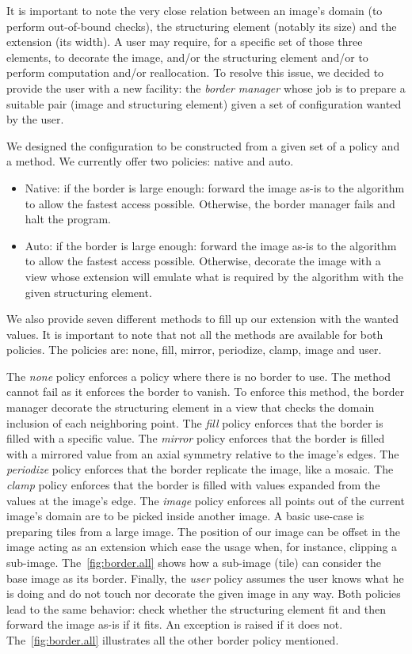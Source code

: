 It is important to note the very close relation between an image's domain (to perform out-of-bound checks), the
structuring element (notably its size) and the extension (its width). A user may require, for a specific set of those
three elements, to decorate the image, and/or the structuring element and/or to perform computation and/or reallocation.
To resolve this issue, we decided to provide the user with a new facility: the \emph{border manager} whose job is to
prepare a suitable pair (image and structuring element) given a set of configuration wanted by the user.

We designed the configuration to be constructed from a given set of a policy and a method. We currently offer two
policies: native and auto.

\begin{itemize}
  \item Native: if the border is large enough: forward the image as-is to the algorithm to allow the fastest access
        possible. Otherwise, the border manager fails and halt the program.
  \item Auto: if the border is large enough: forward the image as-is to the algorithm to allow the fastest access
        possible. Otherwise, decorate the image with a view whose extension will emulate what is required by the
        algorithm with the given structuring element.
\end{itemize}

We also provide seven different methods to fill up our extension with the wanted values. It is important to note that
not all the methods are available for both policies. The policies are: none, fill, mirror, periodize, clamp, image and
user.

The \emph{none} policy enforces a policy where there is no border to use. The method cannot fail as it enforces the
border to vanish. To enforce this method, the border manager decorate the structuring element in a view that checks the
domain inclusion of each neighboring point. The \emph{fill} policy enforces that the border is filled with a specific
value. The \emph{mirror} policy enforces that the border is filled with a mirrored value from an axial symmetry relative
to the image's edges. The \emph{periodize} policy enforces that the border replicate the image, like a mosaic. The
\emph{clamp} policy enforces that the border is filled with values expanded from the values at the image's edge. The
\emph{image} policy enforces all points out of the current image's domain are to be picked inside another image. A basic
use-case is preparing tiles from a large image. The position of our image can be offset in the image acting as an
extension which ease the usage when, for instance, clipping a sub-image. The~\cref{fig:border.all} shows how a sub-image
(tile) can consider the base image as its border. Finally, the \emph{user} policy assumes the user knows what he is
doing and do not touch nor decorate the given image in any way. Both policies lead to the same behavior: check whether
the structuring element fit and then forward the image as-is if it fits. An exception is raised if it does not.
The~\cref{fig:border.all} illustrates all the other border policy mentioned.

